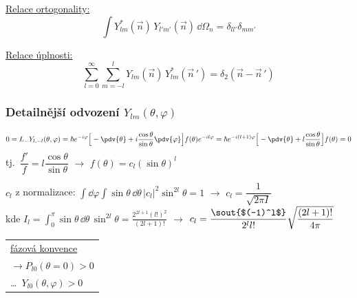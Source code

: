 \begin{minipage}[t]{0.48\textwidth}
\underline{Relace ortogonality:}
\[ \int Y_{lm}^*(\vec n)\,Y_{l'm'}(\vec n)\,\dd\Omega_n = \delta_{ll'}\delta_{mm'} \]
\end{minipage}
\begin{minipage}[t]{0.5\textwidth}
\underline{Relace úplnosti:}
\[ \sum_{l=0}^\infty\sum_{m=-l}^{l} Y_{lm}(\vec n)\,Y_{lm}^*(\vec n\,') = \delta_2(\vec n - \vec n\,') \]
\end{minipage}


\subsubsection*{Detailnější odvození $Y_{lm}(\theta,\varphi)$}
\[
  0 = L_-Y_{l,-l}(\theta,\varphi) = \hbar e^{-i\varphi}\Big[-\pdv{\theta} + i\frac{\cos\theta}{\sin\theta}\pdv{\varphi}\Big]f(\theta)e^{-il\varphi}
  = \hbar e^{-i(l+1)\varphi}\Big[-\pdv{\theta} + l\frac{\cos\theta}{\sin\theta}\Big]f(\theta) = 0
\]
\quad tj.\ \quad $\dfrac{f'}{f} = l\dfrac{\cos\theta}{\sin\theta}$ \quad $\to$ \quad $f(\theta) = c_l(\sin\theta)^l$

$c_l$ z normalizace: \quad $\int\dd\varphi\int\sin\theta\,\dd\theta\,|c_l|^2\sin^{2l}\theta = 1$ \quad $\to$ \quad $c_l = \dfrac{1}{\sqrt{2\pi I}}$ \\
\quad kde \quad $I_l = \displaystyle\int_0^\pi\sin\theta\,\dd\theta\,\sin^{2l}\theta = \frac{2^{2l+1}(l!)^2}{(2l+1)!}$
\quad $\to$ \quad $c_l = \dfrac{\text{\sout{$(-1)^l$}}}{2^l l!}\sqrt{\dfrac{(2l+1)!}{4\pi}}$
\hfill \begin{tabular}[t]{l}\underline{fázová konvence} \\ $\to P_{l0}(\theta = 0) > 0$ \\ \dots\ $Y_{l0}(\theta,\varphi) > 0$\end{tabular}

